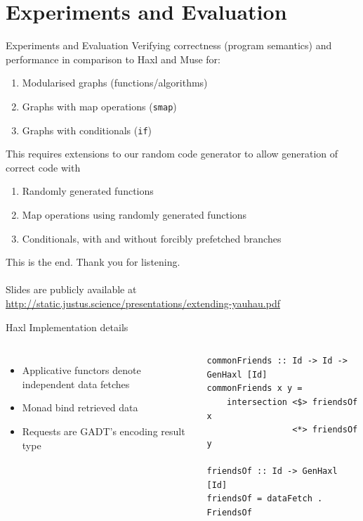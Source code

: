 \documentclass[utf8x,10pt,aspectratio=169]{beamer}
\begin{document}
\section{Experiments and Evaluation}

\begin{frame}{Experiments and Evaluation}
	Verifying correctness (program semantics) and performance in comparison to Haxl and Muse for:
	\begin{enumerate}
		\item Modularised graphs (functions/algorithms)
		\item Graphs with map operations (\texttt{smap})
		\item Graphs with conditionals (\texttt{if})
	\end{enumerate}
	
	This requires extensions to our random code generator to allow generation of correct code with
	
	\begin{enumerate}
		\item Randomly generated functions
		\item Map operations using randomly generated functions
		\item Conditionals, with and without forcibly prefetched branches
	\end{enumerate}
	
\end{frame}

\begin{frame}
	This is the end. Thank you for listening. \\ \\
	Slides are publicly available at \href{http://static.justus.science/presentations/extending-yauhau.pdf}{http://static.justus.science/presentations/extending-yauhau.pdf}
\end{frame}

\appendix

\begin{frame}[fragile]{Haxl Implementation details}

	\begin{columns}
	
		\begin{itemize}
			\item Applicative functors denote independent data fetches
			\item Monad bind retrieved data
			\item Requests are GADT's encoding result type
		\end{itemize}
		\begin{verbatim}
commonFriends :: Id -> Id -> GenHaxl [Id]
commonFriends x y = 
    intersection <$> friendsOf x 
                 <*> friendsOf y

friendsOf :: Id -> GenHaxl [Id]
friendsOf = dataFetch . FriendsOf
		\end{verbatim}		
	\end{columns}
	
\end{frame}
\end{document}
